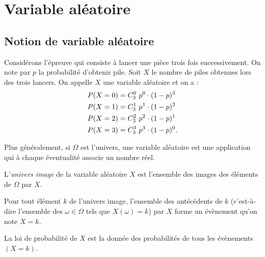       \section{Variable al\'eatoire}
            \subsection{Notion de variable al\'eatoire}
                  \begin{ex}
                        Consid\'erons l'\'epreuve qui consiste \`a lancer une pi\`ece trois fois successivement.
                        On note par $p$ la probabilit\'e d'obtenir pile.
                        Soit $X$ le nombre de piles obtenues lors des trois lancers.
                        On appelle $X$ une variable al\'eatoire et on a :
                              \begin{align*}
                                    P(X = 0) & = C_{3}^{0}\ p^0 \cdot (1-p)^3 \\
                                    P(X = 1) & = C_{3}^{1}\ p^1 \cdot (1-p)^2 \\
                                    P(X = 2) & = C_{3}^{2}\ p^2 \cdot (1-p)^1 \\
                                    P(X = 3) & = C_{3}^{3}\ p^3 \cdot (1-p)^0 .
                              \end{align*}
                  \end{ex}
                  
                  Plus g\'en\'eralement, si $\Omega$ est l'univers, 
                  une variable al\'eatoire est une application qui \`a chaque \'eventualit\'e associe un nombre r\'eel.
                  
                  L'\emph{univers image} de la variable al\'eatoire $X$ est 
                  l'ensemble des images des \'el\'ements de $\Omega$ par $X$.
                  
                  Pour tout \'el\'ement $k$ de l'univers image, l'ensemble des ant\'ec\'edents de $k$
                  (c'est-\`a-dire l'ensemble des $\omega \in \Omega$ tels que $X(\omega) = k$)
                  par $X$ forme un \'ev\`enement qu'on note $X=k$.
                  
                  La loi de probabilit\'e de $X$ est la donn\'ee des probabilit\'es de tous les \'ev\`enements $(X=k)$.
